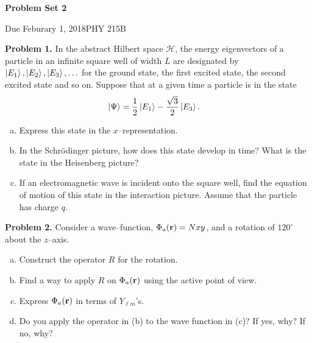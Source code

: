 \documentclass{article}
\newcommand{\Title}     {Problem Set 2}
\newcommand{\DueDate}   {Feburary 1, 2018}
\newcommand{\Course}    {PHY 215B}
\begin{document}
{\huge\bf\Title}

Due \DueDate \hfill \Course

\hrulefill

\textbf{Problem 1.} In the abstract Hilbert space $\mathcal{H}$, the energy eigenvectors of a particle in an infinite square well of width $L$ are designated by $\ket{E_1}, \ket{E_2}, \ket{E_3}, \ldots$ for the ground state, the first excited state, the second excited state and so on. Suppose that at a given time a particle is in the state
\begin{equation*}
\begin{aligned}
    \ket{\Psi} &= \frac{1}{2}\ket{E_1} - \frac{\sqrt{3}}{2}\ket{E_3}.
\end{aligned}
\end{equation*}
\begin{enumerate}[(a)]
    \item Express this state in the $x$--representation.
    \item In the Schr\"odinger picture, how does this state develop in time? What is the state in the Heisenberg picture?
    \item If an electromagnetic wave is incident onto the square well, find the equation of motion of this state in the interaction picture. Assume that the particle has charge $q$.
\end{enumerate}

\hrulefill

\textbf{Problem 2.} Consider a wave--function, $\Phi_a(\vb{r}) = Nxy$, and a rotation of $120^\circ$ about the $z$--axis.
\begin{enumerate}[(a)]
    \item Construct the operator $R$ for the rotation.
    \item Find a way to apply $R$ on $\Phi_a(\vb{r})$ using the active point of view.
    \item Express $\Phi_a(\vb{r})$ in terms of $Y_{\ell m}$'s.
    \item Do you apply the operator in (b) to the wave function in (c)? If yes, why? If no, why?
\end{enumerate}

\hrulefill
\end{document}
